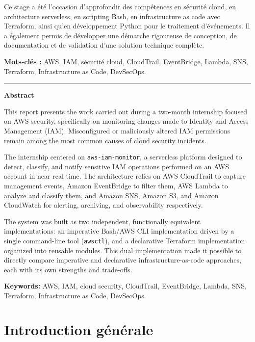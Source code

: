 \documentclass[11pt,a4paper]{report}
\begin{document}
Ce stage a été l'occasion d'approfondir des compétences en sécurité cloud, en architecture serverless, en scripting Bash, en infrastructure as code avec Terraform, ainsi qu'en développement Python pour le traitement d'événements. Il a également permis de développer une démarche rigoureuse de conception, de documentation et de validation d'une solution technique complète.

\textbf{Mots-clés :} AWS, IAM, sécurité cloud, CloudTrail, EventBridge, Lambda, SNS, Terraform, Infrastructure as Code, DevSecOps.

\bigskip
\hrule
\bigskip

\begin{center}\large\bfseries Abstract\end{center}

This report presents the work carried out during a two-month internship focused on AWS security, specifically on monitoring changes made to Identity and Access Management (IAM). Misconfigured or maliciously altered IAM permissions remain among the most common causes of cloud security incidents.

The internship centered on \texttt{aws-iam-monitor}, a serverless platform designed to detect, classify, and notify sensitive IAM operations performed on an AWS account in near real time. The architecture relies on AWS CloudTrail to capture management events, Amazon EventBridge to filter them, AWS Lambda to analyze and classify them, and Amazon SNS, Amazon S3, and Amazon CloudWatch for alerting, archiving, and observability respectively.

The system was built as two independent, functionally equivalent implementations: an imperative Bash/AWS CLI implementation driven by a single command-line tool (\texttt{awsctl}), and a declarative Terraform implementation organized into reusable modules. This dual implementation made it possible to directly compare imperative and declarative infrastructure-as-code approaches, each with its own strengths and trade-offs.

\textbf{Keywords:} AWS, IAM, cloud security, CloudTrail, EventBridge, Lambda, SNS, Terraform, Infrastructure as Code, DevSecOps.

\newpage
\tableofcontents

\newpage
{}

\chapter*{Introduction générale}
\end{document}
